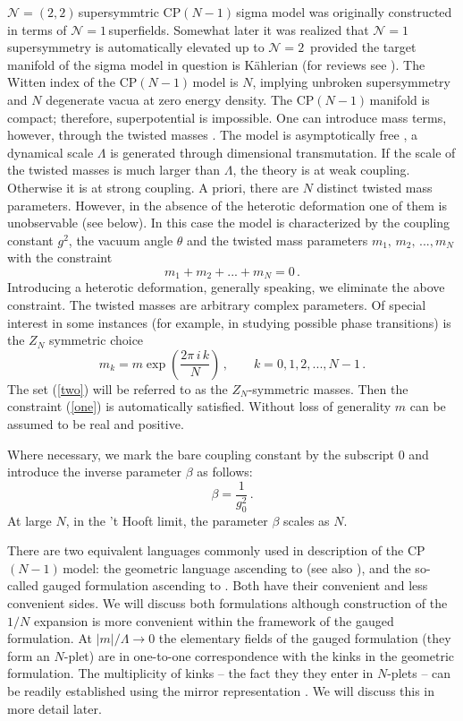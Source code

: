 \documentclass[epsfig,12pt]{article}
\def\beq{\begin{equation}}
\def\eeq{\end{equation}}
\newcommand{\ntwo}{${\mathcal N}=2\,$}
\newcommand{\none}{${\mathcal N}=1\,$}
\newcommand{\ntt}{${\mathcal N}=(2,2)\,$}
\newcommand{\cpn}{CP$(N-1)\,$}
\def\beq{\begin{equation}}
\def\eeq{\end{equation}}
\begin{document}
\ntt supersymmtric \cpn sigma model was originally constructed 
\cite{orco}
in terms of \none superfields. Somewhat later it was realized \cite{Bruno}
that 
\none supersymmetry is automatically elevated up to \ntwo
provided the target manifold of the sigma model in question is K\"ahlerian (for reviews see \cite{rev1,rev2}).
The Witten index \cite{WI} of the \cpn model is $N$, implying unbroken supersymmetry
and $N$ degenerate vacua at zero energy density.
The \cpn manifold is compact; therefore, superpotential is impossible.
One can introduce mass terms, however, through the twisted masses \cite{twisted}.
The model is asymptotically free \cite{BelPo}, a dynamical scale $\Lambda$ is generated through dimensional transmutation. If the scale of the twisted masses is much larger than $\Lambda$, the theory is at weak coupling.
Otherwise it is at strong coupling. A priori, there are $N$ distinct twisted mass parameters.
However, in the absence of the heterotic deformation one of them is unobservable
(see below). In this case the model is characterized by the coupling constant $g^2$,
the vacuum angle $\theta$ and the twisted mass parameters $m_1,\,m_2,\, ..., m_N$
with the constraint
\beq
m_1 + m_2 + ... +m_N =0\,.
\label{one}
\eeq
Introducing a heterotic deformation, generally speaking, we eliminate the above constraint.
The twisted masses are arbitrary complex parameters. Of special interest 
in some instances (for example, in studying possible phase transitions)
is the $Z_N$ symmetric choice
\beq
m_k = m\exp\left(\frac{2\pi \,i\, k}{N}\right)\,,\qquad k = 0,1,2, ... ,N-1\,.
\label{two}
\eeq
The set (\ref{two}) will be referred to as the $Z_N$-symmetric masses.
Then the constraint
(\ref{one}) is automatically satisfied. Without loss of generality $m$ can be assumed
to be real and positive. 

Where necessary, we mark the bare coupling constant by the subscript 0 and introduce
the inverse parameter $\beta$ as follows:
\beq
\beta = \frac{1}{g_0^2}\,.
\eeq
At large $N$, in the 't Hooft limit,  the parameter $\beta$ scales as $N$.

There are two equivalent languages commonly used in description of the \cpn model:
the geometric language ascending to \cite{Bruno} (see also \cite{rev2}), and the
so-called gauged formulation ascending to \cite{W79,W93}. Both have their convenient and less convenient sides.
We will discuss both formulations although construction of the $1/N$ expansion is
more convenient within the framework of the gauged formulation. At $|m|/\Lambda \to 0$
the elementary fields of the
gauged formulation (they form an  $N$-plet) are in one-to-one correspondence with the kinks in the geometric formulation.
The multiplicity of kinks -- the fact they they enter in $N$-plets --
can be readily established \cite{adam} using the mirror representation \cite{MR1}. We will discuss this in more detail
later. 
\end{document}
